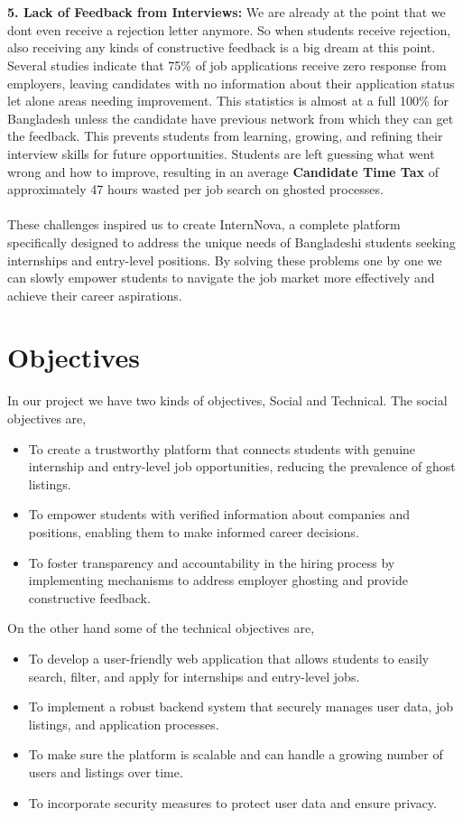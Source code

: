 \documentclass[a4paper, 14pt, openany]{extreport}
\begin{document}
	\\
\\
	\textbf{5. Lack of Feedback from Interviews:} We are already at the point that we dont even receive a rejection letter anymore. So when students receive rejection, also receiving any kinds of constructive feedback is a big dream at this point. Several studies indicate that 75\% of job applications receive zero response from employers\cite{ghosting_index_2025}, leaving candidates with no information about their application status let alone areas needing improvement. This statistics is almost at a full 100\% for Bangladesh unless the candidate have previous network from which they can get the feedback. This prevents students from learning, growing, and refining their interview skills for future opportunities. Students are left guessing what went wrong and how to improve, resulting in an average \textbf{Candidate Time Tax} of approximately 47 hours wasted per job search on ghosted processes\cite{ghosting_index_2025}.
	\\
\\
	These challenges inspired us to create InternNova, a complete platform specifically designed to address the unique needs of Bangladeshi students seeking internships and entry-level positions. By solving these problems one by one we can slowly empower students to navigate the job market more effectively and achieve their career aspirations.
	
	\section{Objectives}
	In our project we have two kinds of objectives, Social and Technical. The social objectives are, 
	\begin{itemize}
		\item To create a trustworthy platform that connects students with genuine internship and entry-level job opportunities, reducing the prevalence of ghost listings.
		\item To empower students with verified information about companies and positions, enabling them to make informed career decisions.
		\item To foster transparency and accountability in the hiring process by implementing mechanisms to address employer ghosting and provide constructive feedback.
	\end{itemize}
	On the other hand some of the technical objectives are,
	\begin{itemize}
		\item To develop a user-friendly web application that allows students to easily search, filter, and apply for internships and entry-level jobs.
		\item To implement a robust backend system that securely manages user data, job listings, and application processes.
		\item To make sure the platform is scalable and can handle a growing number of users and listings over time.
		\item To incorporate security measures to protect user data and ensure privacy.
	\end{itemize}
\end{document}
